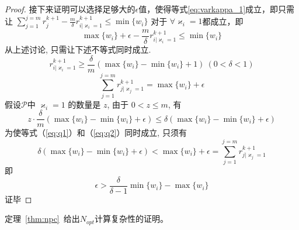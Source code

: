 \begin{proof}
接下来证明可以选择足够大的$\epsilon$值，使得等式\ref{eq:varkappa_1}成立，即只需让 $\sum_{j=1}^{j=m}r_j^{k+1}-\frac{m}{\delta}r_{i|\varkappa_i=1}^{k+1}\leq \min\{w_i\}$ 对于 $\forall \varkappa_i=1$都成立，即
\[
\max\{w_i\}+\epsilon-\frac{m}{\delta}r_{i|\varkappa_i=1}^{k+1}\leq \min\{w_i\}
\]
从上述讨论, 只需让下述不等式同时成立.
\begin{equation}
r_{i|\varkappa_i=1}^{k+1}\geq\frac{\delta}{m}(\max\{w_i\}-\min\{w_i\}+1)~(0<\delta<1)
\label{eq:q1}
\end{equation}
\begin{equation}
\sum_{j=1}^{j=m}r_{j|\varkappa_j=1}^{k+1}=\max\{w_i\}+\epsilon
\label{eq:q2}
\end{equation}
假设$\mathcal{P}$中 $\varkappa_i=1$ 的数量是 $z$, 由于 $0<z\leq m$, 有
\[
z\cdot\frac{\delta}{m}(\max\{w_i\}-\min\{w_i\}+\epsilon) \leq  
\delta(\max\{w_i\}-\min\{w_i\}+\epsilon) 
\]
为使等式（\ref{eq:q1}）和（\ref{eq:q2}）同时成立, 只须有
\[
\delta(\max\{w_i\}-\min\{w_i\}+\epsilon) < \max\{w_i\}+\epsilon = \sum_{j=1}^{j=m}r_{j|\varkappa_j=1}^{k+1}
\]
即
\[
\epsilon>\frac{\delta}{\delta-1}\min\{w_i\}-\max\{w_i\}
\]
证毕
\end{proof}

定理~\ref{thm:npc}~给出$N_{opt}$计算复杂性的证明。


